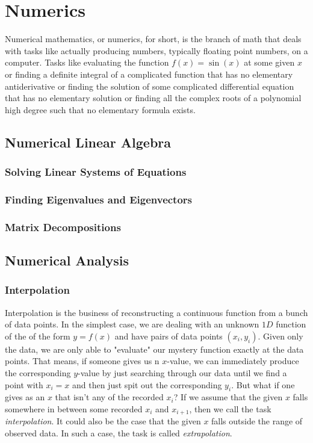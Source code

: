 \chapter{Numerics}
Numerical mathematics, or numerics, for short, is the branch of math that deals with tasks like actually producing numbers, typically floating point numbers, on a computer. Tasks like evaluating the function $f(x) = \sin(x)$ at some given $x$ or finding a definite integral of a complicated function that has no elementary antiderivative or finding the solution of some complicated differential equation that has no elementary solution or finding all the complex roots of a polynomial high degree such that no elementary formula exists. 



\section{Numerical Linear Algebra}

\subsection{Solving Linear Systems of Equations}

\subsection{Finding Eigenvalues and Eigenvectors}

\subsection{Matrix Decompositions}





\section{Numerical Analysis}


\subsection{Interpolation}
Interpolation is the business of reconstructing a continuous function from a bunch of data points. In the simplest case, we are dealing with an unknown $1D$ function of the of the form $y = f(x)$ and have pairs of data points $(x_i, y_i)$. Given only the data, we are only able to "evaluate" our mystery function exactly at the data points. That means, if someone gives us n $x$-value, we can immediately produce the corresponding $y$-value by just searching through our data until we find a point with $x_i = x$ and then just spit out the corresponding $y_i$. But what if one gives as an $x$ that isn't any of the recorded $x_i$? If we assume that the given $x$ falls somewhere in between some recorded $x_i$ and $x_{i+1}$, then we call the task \emph{interpolation}. It could also be the case that the given $x$ falls outside the range of observed data. In such a case, the task is called \emph{extrapolation}.


